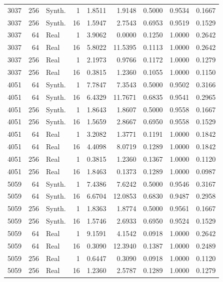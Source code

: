 \documentclass{article}
\begin{document}
\begin{center}
\begin{longtable}{rrlrrrrrr}
3037 & 256 & Synth. & 1 & 1.8511 & 1.9148 & 0.5000 & 0.9534 & 0.1667\\
3037 & 256 & Synth. & 16 & 1.5947 & 2.7543 & 0.6953 & 0.9519 & 0.1529\\
3037 & 64 & Real & 1 & 3.9062 & 0.0000 & 0.1250 & 1.0000 & 0.2642\\
3037 & 64 & Real & 16 & 5.8022 & 11.5395 & 0.1113 & 1.0000 & 0.2642\\
3037 & 256 & Real & 1 & 2.1973 & 0.9766 & 0.1172 & 1.0000 & 0.1279\\
3037 & 256 & Real & 16 & 0.3815 & 1.2360 & 0.1055 & 1.0000 & 0.1150\\
4051 & 64 & Synth. & 1 & 7.7847 & 7.3543 & 0.5000 & 0.9502 & 0.3166\\
4051 & 64 & Synth. & 16 & 6.4329 & 11.7671 & 0.6835 & 0.9541 & 0.2965\\
4051 & 256 & Synth. & 1 & 1.8643 & 1.8607 & 0.5000 & 0.9558 & 0.1667\\
4051 & 256 & Synth. & 16 & 1.5659 & 2.8667 & 0.6950 & 0.9558 & 0.1529\\
4051 & 64 & Real & 1 & 3.2082 & 1.3771 & 0.1191 & 1.0000 & 0.1842\\
4051 & 64 & Real & 16 & 4.4098 & 8.0719 & 0.1289 & 1.0000 & 0.1842\\
4051 & 256 & Real & 1 & 0.3815 & 1.2360 & 0.1367 & 1.0000 & 0.1120\\
4051 & 256 & Real & 16 & 1.8463 & 0.1373 & 0.1289 & 1.0000 & 0.0987\\
5059 & 64 & Synth. & 1 & 7.4386 & 7.6242 & 0.5000 & 0.9546 & 0.3167\\
5059 & 64 & Synth. & 16 & 6.6704 & 12.0853 & 0.6830 & 0.9487 & 0.2958\\
5059 & 256 & Synth. & 1 & 1.8363 & 1.8774 & 0.5000 & 0.9561 & 0.1667\\
5059 & 256 & Synth. & 16 & 1.5746 & 2.6933 & 0.6950 & 0.9524 & 0.1529\\
5059 & 64 & Real & 1 & 9.1591 & 4.1542 & 0.0918 & 1.0000 & 0.2642\\
5059 & 64 & Real & 16 & 0.3090 & 12.3940 & 0.1387 & 1.0000 & 0.2489\\
5059 & 256 & Real & 1 & 0.6447 & 0.3090 & 0.0918 & 1.0000 & 0.1120\\
5059 & 256 & Real & 16 & 1.2360 & 2.5787 & 0.1289 & 1.0000 & 0.1279\\
\bottomrule\end{longtable}
\end{center}
\end{document}
